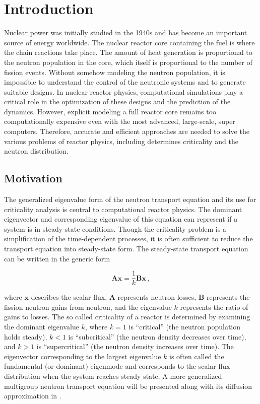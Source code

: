 \cleardoublepage

\chapter{Introduction}
\label{chapter:intro}
Nuclear power was initially studied in the 1940s and has become an important source of energy worldwide.
The nuclear reactor core containing the fuel is where the chain reactions take place.
The amount of heat generation is proportional to the neutron population in the core, which itself is proportional to the number of fission events. 
Without somehow modeling the neutron population, it is impossible to understand the control of the neutronic systems and to generate suitable designs. 
In nuclear reactor physics, computational simulations play a critical role in the optimization of these designs and the prediction of the dynamics.
However, explicit modeling a full reactor core remains too computationally expensive even with the most advanced, large-scale, super computers. 
Therefore, accurate and efficient approaches are needed to solve the various problems of reactor physics, including determines criticality and the neutron distribution.

\section{Motivation}

The generalized eigenvalue form of the neutron transport equation and its use for criticality analysis is central to computational reactor physics.
The dominant eigenvector and corresponding eigenvalue of this equation can represent if a system is in steady-state conditions.
Though the criticality problem is a simplification of the time-dependent processes, it is often sufficient to reduce the transport equation into steady-state form. 
The steady-state transport equation can be written in the generic form

\begin{equation}
 \mathbf{Ax} = \frac{1}{k} \mathbf{Bx}  \, ,
 \label{eq:Axb}
\end{equation}

where $\mathbf{x}$ describes the scalar flux, $\mathbf{A}$ represents neutron losses,  $\mathbf{B}$ represents the fission neutron gains from neutron, and the eigenvalue $k$ represents the ratio of gains to losses.
The so called criticality of a reactor is determined by examining the dominant eigenvalue $k$, where $k=1$ is ``critical'' (the neutron population holds steady), $k<1$ is ``subcritical'' (the neutron density decreases over time), and $k > 1$ is ``supercritical'' (the neutron density increases over time).
The eigenvector corresponding to the largest eigenvalue $k$ is often called the fundamental (or dominant) eigenmode and corresponds to the scalar flux distribution when the system reaches steady state.
A more generalized multigroup neutron transport equation will be presented along with its diffusion approximation in .

